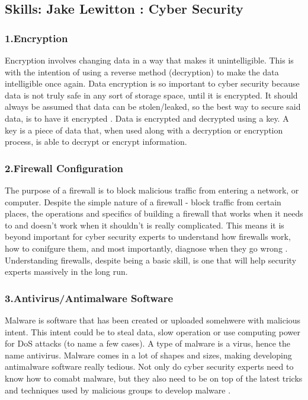 \documentclass[a4paper, 11pt]{report}
\begin{document}
\subsection{Skills: Jake Lewitton : Cyber Security}
    \subsubsection{1.Encryption}
    Encryption involves changing data in a way that makes it unintelligible. This is with the intention of using a reverse method (decryption) to make the data intelligible once again. Data encryption is so important to cyber security because data is not truly safe in any sort of storage space, until it is encrypted. It should always be assumed that data can be stolen/leaked, so the best way to secure said data, is to have it encrypted \cite{jake1}. Data is encrypted and decrypted using a key. A key is a piece of data that, when used along with a decryption or encryption process, is able to decrypt or encrypt information.
    \subsubsection{2.Firewall Configuration}
    The purpose of a firewall is to block malicious traffic from entering a network, or computer. Despite the simple nature of a firewall - block traffic from certain places, the operations and specifics of building a firewall that works when it needs to and doesn't work when it shouldn't is really complicated. This means it is beyond important for cyber security experts to understand how firewalls work, how to conifgure them, and most importantly, diagnose when they go wrong \cite{jake2}. Understanding firewalls, despite being a basic skill, is one that will help security experts massively in the long run.
    \subsubsection{3.Antivirus/Antimalware Software}
    Malware is software that has been created or uploaded somehwere with malicious intent. This intent could be to steal data, slow operation or use computing power for DoS attacks (to name a few cases). A type of malware is a virus, hence the name antivirus. Malware comes in a lot of shapes and sizes, making developing antimalware software really tedious. Not only do cyber security experts need to know how to comabt malware, but they also need to be on top of the latest tricks and techniques used by malicious groups to develop malware \cite{jake3}.
\end{document}
